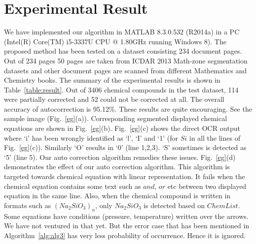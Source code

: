\section{Experimental Result}
We have implemented our algorithm in MATLAB 8.3.0.532
(R2014a) in a PC (Intel(R) Core(TM) i5-3337U CPU @ 1.80GHz
running Windows 8). The proposed method has been tested on
a dataset consisting 234 document pages. Out of 234 pages 50
pages are taken from ICDAR 2013 Math-zone segmentation
datasets and other document pages are scanned from different Mathematics and
Chemistry books. 
The summary of the experimental results
is shown in Table~\ref{table:result}. Out of 3406 chemical compounds in the test dataset, 114 were partially corrected and 52 could not be corrected at all. The overall accuracy of autocorrection is 95.12\%. These results are quite encouraging. See the sample image (Fig.~\ref{eg}(a)). Corresponding segmented displayed chemical equations are shown in Fig.~\ref{eg}(b). Fig.~\ref{eg}(c) shows the direct OCR output where `i' has been wrongly identified as `l', `I' and `1' (for $Si$ in all the lines of  Fig.~\ref{eg}(c)). Similarly `O' results in `0' (line 1,2,3). `S' sometimes is detected as `5' (line 5). Our auto correction algorithm remedies these issues. Fig.~\ref{eg}(d) demonstrates the effect of our auto correction algorithm. This algorithm is targeted towards chemical equation with linear representation.
It fails when the chemical equation contains some text such as $and$, $or$ etc between two displayed equation in the same line. Also, when the chemical compound is written in formats such as $(Na_2SiO_3)_n$, only $Na_2SiO_3$ is detected based on $ChemList$. Some equations have conditions (pressure, temperature) written over the arrows. We have not ventured in that yet. But the error case that has been mentioned in Algorithm~\ref{alg:alg3} has very less probability of occurrence. Hence it is ignored.



